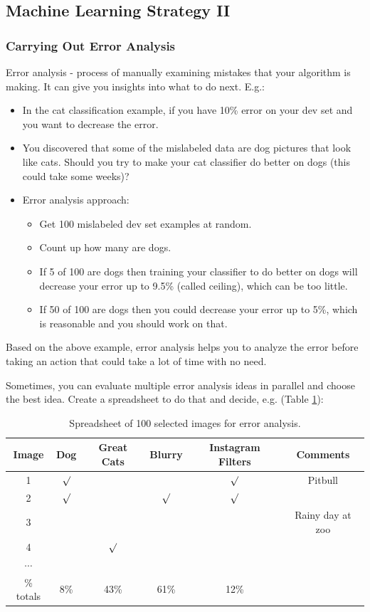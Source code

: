 \subsection{Machine Learning Strategy II}
\subsubsection{Carrying Out Error Analysis}
Error analysis - process of manually examining mistakes that your algorithm is making. It can give you insights into what to do next. E.g.:

\begin{itemize}
    \item In the cat classification example, if you have 10\% error on your dev set and you want to decrease the error.
    \item You discovered that some of the mislabeled data are dog pictures that look like cats. Should you try to make your cat classifier do better on dogs (this could take some weeks)?
    \item Error analysis approach:
    \begin{itemize}
        \item Get 100 mislabeled dev set examples at random.
        \item Count up how many are dogs.
        \item If 5 of 100 are dogs then training your classifier to do better on dogs will decrease your error up to 9.5\% (called ceiling), which can be too little.
        \item If 50 of 100 are dogs then you could decrease your error up to 5\%, which is reasonable and you should work on that.
    \end{itemize}
\end{itemize}

Based on the above example, error analysis helps you to analyze the error before taking an action that could take a lot of time with no need.

Sometimes, you can evaluate multiple error analysis ideas in parallel and choose the best idea. Create a spreadsheet to do that and decide, e.g. (Table \ref{error-analysis}):

\begin{table}[!htbp]
    \centering
    \begin{tabular}{c|c|c|c|c|c}
        \hline
        Image & Dog & Great Cats & Blurry & Instagram Filters & Comments \\
        \hline
        1 & $\surd$ & & & $\surd$ & Pitbull\\
        2 & $\surd$ & & $\surd$ & $\surd$ &\\
        3 &&&&& Rainy day at zoo\\
        4 && $\surd$&&&\\
        $\cdots$ &&&&&\\
        \hline
        \% totals & 8\% & 43\% & 61\% & 12\% & \\
        \hline
    \end{tabular}
    \caption{Spreadsheet of 100 selected images for error analysis.}
    \label{error-analysis}
\end{table}

